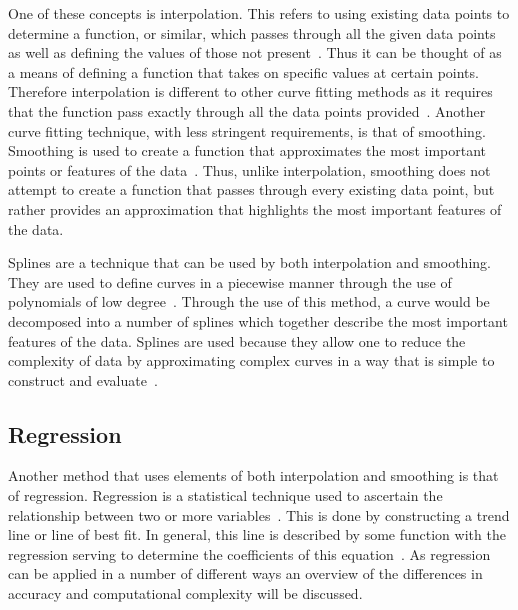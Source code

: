 One of these concepts is interpolation. This refers to using existing data points to determine a function, or similar, which passes through all the given data points as well as defining the values of those not present~\citep{Mole04}. Thus it can be thought of as a means of defining a function that takes on specific values at certain points. Therefore interpolation is different to other curve fitting methods as it requires that the function pass exactly through all the data points provided~\citep{Akim70}. Another curve fitting technique, with less stringent requirements, is that of smoothing. Smoothing is used to create a function that approximates the most important points or features of the data~\citep{Savi64}. Thus, unlike interpolation, smoothing does not attempt to create a function that passes through every existing data point, but rather provides an approximation that highlights the most important features of the data.

Splines are a technique that can be used by both interpolation and smoothing. They are used to define curves in a piecewise manner through the use of polynomials of low degree~\citep{Mara10}. Through the use of this method, a curve would be decomposed into a number of splines which together describe the most important features of the data. Splines are used because they allow one to reduce the complexity of data by approximating complex curves in a way that is simple to construct and evaluate~\citep{Dier93}.

\subsection{Regression}
Another method that uses elements of both interpolation and smoothing is that of regression. Regression is a statistical technique used to ascertain the relationship between two or more variables~\citep{Syke00}. This is done by constructing a trend line or line of best fit. In general, this line is described by some function with the regression serving to determine the coefficients of this equation~\citep{Syke00}. As regression can be applied in a number of different ways an overview of the differences in accuracy and computational complexity will be discussed.

